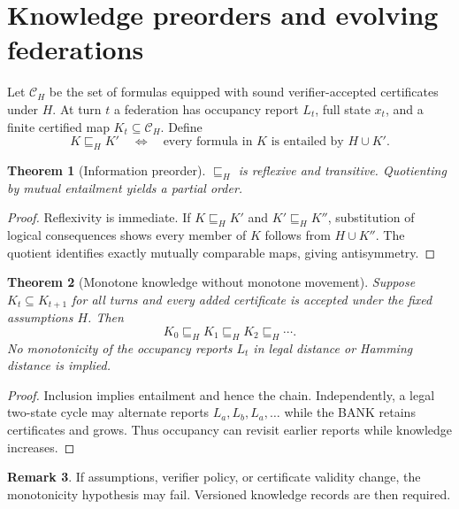 \documentclass[11pt]{article}
\newtheorem{theorem}{Theorem}[section]
\theoremstyle{definition}
\newtheorem{remark}[theorem]{Remark}
\begin{document}
\section{Knowledge preorders and evolving federations}
Let $\mathcal C_H$ be the set of formulas equipped with sound verifier-accepted certificates under $H$. At turn $t$ a federation has occupancy report $L_t$, full state $x_t$, and a finite certified map $K_t\subseteq\mathcal C_H$. Define
\[
K\sqsubseteq_H K'
\quad\Longleftrightarrow\quad
\text{every formula in $K$ is entailed by }H\cup K'.
\]
\begin{theorem}[Information preorder]
$\sqsubseteq_H$ is reflexive and transitive. Quotienting by mutual entailment yields a partial order.
\end{theorem}
\begin{proof}
Reflexivity is immediate. If $K\sqsubseteq_H K'$ and $K'\sqsubseteq_H K''$, substitution of logical consequences shows every member of $K$ follows from $H\cup K''$. The quotient identifies exactly mutually comparable maps, giving antisymmetry.
\end{proof}
\begin{theorem}[Monotone knowledge without monotone movement]
Suppose $K_t\subseteq K_{t+1}$ for all turns and every added certificate is accepted under the fixed assumptions $H$. Then
\[
K_0\sqsubseteq_H K_1\sqsubseteq_H K_2\sqsubseteq_H\cdots.
\]
No monotonicity of the occupancy reports $L_t$ in legal distance or Hamming distance is implied.
\end{theorem}
\begin{proof}
Inclusion implies entailment and hence the chain. Independently, a legal two-state cycle may alternate reports $L_a,L_b,L_a,\ldots$ while the BANK retains certificates and grows. Thus occupancy can revisit earlier reports while knowledge increases.
\end{proof}
\begin{remark}
If assumptions, verifier policy, or certificate validity change, the monotonicity hypothesis may fail. Versioned knowledge records are then required.
\end{remark}
\end{document}

